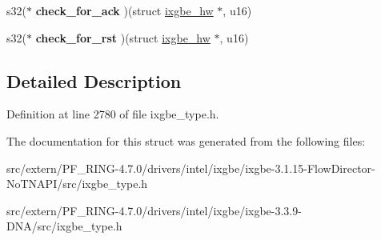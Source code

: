 \begin{DoxyCompactItemize}
\item 
\hypertarget{structixgbe__mbx__operations_a306189e205b2a769786605f0de8ea7f1}{
s32($\ast$ {\bfseries check\_\-for\_\-ack} )(struct \hyperlink{structixgbe__hw}{ixgbe\_\-hw} $\ast$, u16)}
\label{structixgbe__mbx__operations_a306189e205b2a769786605f0de8ea7f1}

\item 
\hypertarget{structixgbe__mbx__operations_af05b7491157e02d5c85c7f9ef619c18b}{
s32($\ast$ {\bfseries check\_\-for\_\-rst} )(struct \hyperlink{structixgbe__hw}{ixgbe\_\-hw} $\ast$, u16)}
\label{structixgbe__mbx__operations_af05b7491157e02d5c85c7f9ef619c18b}

\end{DoxyCompactItemize}


\subsection{Detailed Description}


Definition at line 2780 of file ixgbe\_\-type.h.



The documentation for this struct was generated from the following files:\begin{DoxyCompactItemize}
\item 
src/extern/PF\_\-RING-\/4.7.0/drivers/intel/ixgbe/ixgbe-\/3.1.15-\/FlowDirector-\/NoTNAPI/src/ixgbe\_\-type.h\item 
src/extern/PF\_\-RING-\/4.7.0/drivers/intel/ixgbe/ixgbe-\/3.3.9-\/DNA/src/ixgbe\_\-type.h\end{DoxyCompactItemize}
